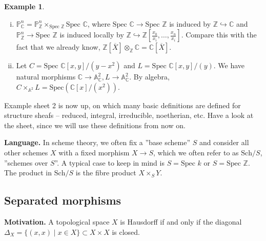 \documentclass{article}
\theoremstyle{definition}
\newtheorem{example}{Example}[section]
\begin{document}
\begin{example}
    \begin{enumerate}[(i)]
        \item $\mathbb{P}_{\mathbb{C}}^n = \mathbb{P}_{\mathbb{Z}}^n \times_{\text{Spec }\mathbb{Z}} \text{Spec }\mathbb{C}$, where $\text{Spec }\mathbb{C} \to \text{Spec }\mathbb{Z}$ is induced by $\mathbb{Z} \hookrightarrow \mathbb{C}$ and $\mathbb{P}_{\mathbb{Z}}^n \to \text{Spec }\mathbb{Z}$ is induced locally by $\mathbb{Z} \hookrightarrow \mathbb{Z}\left[\frac{x_0}{x_i},\ldots,\frac{x_n}{x_i}\right]$. Compare this with the fact that we already know, $\mathbb{Z}[\overline{X}] \otimes_{\mathbb{Z}} \mathbb{C} = \mathbb{C}[\overline{X}]$.
        \item Let $C = \text{Spec }\mathbb{C}[x,y]/(y-x^2)$ and $L = \text{Spec }\mathbb{C}[x,y]/(y)$. We have natural morphisms $\mathbb{C} \to \mathbb{A}_{\mathbb{C}}^2, L \to \mathbb{A}_{\mathbb{C}}^2$. By algebra, $C \times_{\mathbb{A}^2} L = \text{Spec}(\mathbb{C}[x]/(x^2))$.
    \end{enumerate}
\end{example}

Example sheet 2 is now up, on which many basic definitions are defined for structure sheafs -- reduced, integral, irreducible, noetherian, etc. Have a look at the sheet, since we will use these definitions from now on.
\vspace{1mm}
 
\textbf{Language.} In scheme theory, we often fix a ''base scheme'' $S$ and consider all other schemes $X$ with a fixed morphism $X \to S$, which we often refer to as $\text{Sch}/S$, ''schemes over $S$''. A typical case to keep in mind is $S = \text{Spec }k$ or $S = \text{Spec }\mathbb{Z}$. The product in $\text{Sch}/S$ is the fibre product $X \times_S Y$.

\subsection{Separated morphisms}
\textbf{Motivation.} A topological space $X$ is Hausdorff if and only if the diagonal $\Delta_X = \{(x,x) \mid x \in X\} \subset X \times X$ is closed. 
\end{document}
